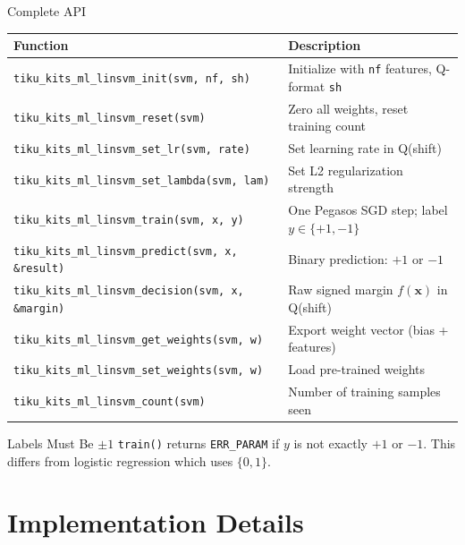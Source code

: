 \documentclass[aspectratio=169, 10pt]{beamer}
\begin{document}
\begin{frame}[fragile]{Complete API}
\begin{table}
\centering
\small
\begin{tabular}{@{}lp{8cm}@{}}
\toprule
\textbf{Function} & \textbf{Description} \\
\midrule
\texttt{tiku\_kits\_ml\_linsvm\_init(svm, nf, sh)}
  & Initialize with \texttt{nf} features, Q-format \texttt{sh} \\
\texttt{tiku\_kits\_ml\_linsvm\_reset(svm)}
  & Zero all weights, reset training count \\
\texttt{tiku\_kits\_ml\_linsvm\_set\_lr(svm, rate)}
  & Set learning rate in Q(shift) \\
\texttt{tiku\_kits\_ml\_linsvm\_set\_lambda(svm, lam)}
  & Set L2 regularization strength \\
\midrule
\texttt{tiku\_kits\_ml\_linsvm\_train(svm, x, y)}
  & One Pegasos SGD step; label $y \in \{+1,-1\}$ \\
\texttt{tiku\_kits\_ml\_linsvm\_predict(svm, x, \&result)}
  & Binary prediction: $+1$ or $-1$ \\
\texttt{tiku\_kits\_ml\_linsvm\_decision(svm, x, \&margin)}
  & Raw signed margin $f(\mathbf{x})$ in Q(shift) \\
\midrule
\texttt{tiku\_kits\_ml\_linsvm\_get\_weights(svm, w)}
  & Export weight vector (bias + features) \\
\texttt{tiku\_kits\_ml\_linsvm\_set\_weights(svm, w)}
  & Load pre-trained weights \\
\texttt{tiku\_kits\_ml\_linsvm\_count(svm)}
  & Number of training samples seen \\
\bottomrule
\end{tabular}
\end{table}

\vspace{0.3em}
\begin{alertblock}{Labels Must Be $\pm 1$}
\texttt{train()} returns \texttt{ERR\_PARAM} if $y$ is not exactly
$+1$ or $-1$. This differs from logistic regression which uses $\{0, 1\}$.
\end{alertblock}
\end{frame}

\section{Implementation Details}
\end{document}
